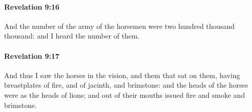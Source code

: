 		\paragraph{Revelation 9:16} %
			\label{REVELATIONNT-9-16}

			And the number of the army of the horsemen were two hundred thousand thousand: and I heard the number of them.

			\begin{framed}
			\scriptsize
				\begin{compactdesc}
					\item[SBLG] 
				\end{compactdesc}
			\end{framed}

		\paragraph{Revelation 9:17} %
			\label{REVELATIONNT-9-17}

			And thus I saw the horses in the vision, and them that sat on them, having breastplates of fire, and of jacinth, and brimstone: and the heads of the horses were as the heads of lions; and out of their mouths issued fire and smoke and brimstone.

